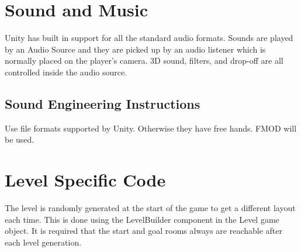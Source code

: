 \documentclass[11pt]{article}
\begin{document}
\section{Sound and Music}
Unity has built in support for all the standard audio formats. Sounds are played by an Audio Source and they are picked up by an audio listener which is normally placed on the player’s camera. 3D sound, filters, and drop-off are all controlled inside the audio source.
\subsection{Sound Engineering Instructions}
Use file formats supported by Unity. Otherwise they have free hands. FMOD will be used.
\section{Level Specific Code}
The level is randomly generated at the start of the game to get a different layout each time. This is done using the LevelBuilder component in the Level game object. It is required that the start and goal rooms always are reachable after each level generation.
\end{document}
